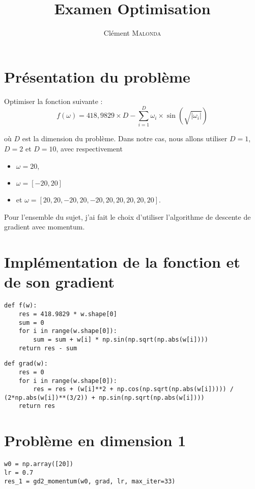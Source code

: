 \documentclass[12pt]{article}
\begin{document}
\title{Examen Optimisation}
\author{Clément \textsc{Malonda}}
\maketitle

\lstset{language=python}

\section*{Présentation du problème}

Optimiser la fonction suivante :
$$f(\omega) = 418,9829\times D - \sum_{i=1}^{D}\omega_i \times \sin(\sqrt{|\omega_i|})$$

où $D$ est la dimension du problème. Dans notre cas, nous allons utiliser $D = 1$, $D = 2$ et $D = 10$, avec respectivement
\begin{itemize}
    \item[\textbullet] $\omega = 20$,
    \item[\textbullet] $\omega = [-20, 20]$
    \item[\textbullet]et $\omega = [20, 20, -20, 20, -20, 20, 20, 20, 20, 20]$.
\end{itemize}

Pour l'ensemble du sujet, j'ai fait le choix d'utiliser l'algorithme de descente de gradient avec momentum.

\section{Implémentation de la fonction et de son gradient}
\begin{lstlisting}
def f(w):
    res = 418.9829 * w.shape[0]
    sum = 0
    for i in range(w.shape[0]):
        sum = sum + w[i] * np.sin(np.sqrt(np.abs(w[i])))
    return res - sum
\end{lstlisting}

\begin{lstlisting}
def grad(w):
    res = 0
    for i in range(w.shape[0]):
        res = res + (w[i]**2 + np.cos(np.sqrt(np.abs(w[i])))) / (2*np.abs(w[i])**(3/2)) + np.sin(np.sqrt(np.abs(w[i])))
    return res
\end{lstlisting}

\section*{Problème en dimension 1}
\begin{lstlisting}
w0 = np.array([20])
lr = 0.7
res_1 = gd2_momentum(w0, grad, lr, max_iter=33)
\end{lstlisting}
\end{document}
